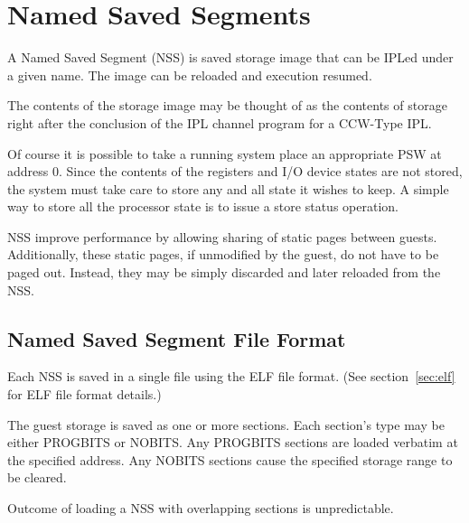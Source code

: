 \chapter{Named Saved Segments}
\label{chap:cp-nss}
\cbstart
{}

A Named Saved Segment (NSS) is saved storage image that can be IPLed under a
given name.  The image can be reloaded and execution resumed.

The contents of the storage image may be thought of as the contents of
storage right after the conclusion of the IPL channel program for a CCW-Type
IPL.

Of course it is possible to take a running system place an appropriate PSW
at address 0.  Since the contents of the registers and I/O device states are
not stored, the system must take care to store any and all state it wishes
to keep.  A simple way to store all the processor state is to issue a store
status operation.

NSS improve performance by allowing sharing of static pages between guests.
Additionally, these static pages, if unmodified by the guest, do not have to
be paged out.  Instead, they may be simply discarded and later reloaded from
the NSS.

\section{Named Saved Segment File Format}
Each NSS is saved in a single file using the ELF file format.  (See
section~\ref{sec:elf} for ELF file format details.)

The guest storage is saved as one or more sections. Each section's type may
be either PROGBITS or NOBITS.  Any PROGBITS sections are loaded verbatim at
the specified address.  Any NOBITS sections cause the specified storage
range to be cleared.

Outcome of loading a NSS with overlapping sections is unpredictable.
\cbend

